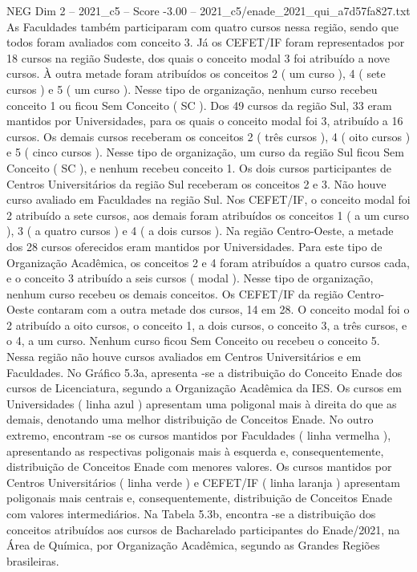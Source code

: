 \begin{textsample}{NEG Dim 2 – 2021\_c5 – Score -3.00 – 2021\_c5/enade\_2021\_qui\_a7d57fa827.txt}
As Faculdades também participaram com quatro cursos nessa região, sendo que todos foram avaliados com conceito 3.
Já os CEFET/IF foram representados por 18 cursos na região Sudeste, dos quais o conceito modal 3 foi atribuído a nove cursos.
À outra metade foram atribuídos os conceitos 2 ( um curso ), 4 ( sete cursos ) e 5 ( um curso ).
Nesse tipo de organização, nenhum curso recebeu conceito 1 ou ficou Sem Conceito ( SC ).
Dos 49 cursos da região Sul, 33 eram mantidos por Universidades, para os quais o conceito modal foi 3, atribuído a 16 cursos.
Os demais cursos receberam os conceitos 2 ( três cursos ), 4 ( oito cursos ) e 5 ( cinco cursos ).
Nesse tipo de organização, um curso da região Sul ficou Sem Conceito ( SC ), e nenhum recebeu conceito 1.
Os dois cursos participantes de Centros Universitários da região Sul receberam os conceitos 2 e 3.
Não houve curso avaliado em Faculdades na região Sul.
Nos CEFET/IF, o conceito modal foi 2 atribuído a sete cursos, aos demais foram atribuídos os conceitos 1 ( a um curso ), 3 ( a quatro cursos ) e 4 ( a dois cursos ).
Na região Centro-Oeste, a metade dos 28 cursos oferecidos eram mantidos por Universidades.
Para este tipo de Organização Acadêmica, os conceitos 2 e 4 foram atribuídos a quatro cursos cada, e o conceito 3 atribuído a seis cursos ( modal ).
Nesse tipo de organização, nenhum curso recebeu os demais conceitos.
Os CEFET/IF da região Centro-Oeste contaram com a outra metade dos cursos, 14 em 28.
O conceito modal foi o 2 atribuído a oito cursos, o conceito 1, a dois cursos, o conceito 3, a três cursos, e o 4, a um curso.
Nenhum curso ficou Sem Conceito ou recebeu o conceito 5.
Nessa região não houve cursos avaliados em Centros Universitários e em Faculdades.
No Gráfico 5.3a, apresenta -se a distribuição do Conceito Enade dos cursos de Licenciatura, segundo a Organização Acadêmica da IES.
Os cursos em Universidades ( linha azul ) apresentam uma poligonal mais à direita do que as demais, denotando uma melhor distribuição de Conceitos Enade.
No outro extremo, encontram -se os cursos mantidos por Faculdades ( linha vermelha ), apresentando as respectivas poligonais mais à esquerda e, consequentemente, distribuição de Conceitos Enade com menores valores.
Os cursos mantidos por Centros Universitários ( linha verde ) e CEFET/IF ( linha laranja ) apresentam poligonais mais centrais e, consequentemente, distribuição de Conceitos Enade com valores intermediários.
Na Tabela 5.3b, encontra -se a distribuição dos conceitos atribuídos aos cursos de Bacharelado participantes do Enade/2021, na Área de Química, por Organização Acadêmica, segundo as Grandes Regiões brasileiras.

\end{textsample}
